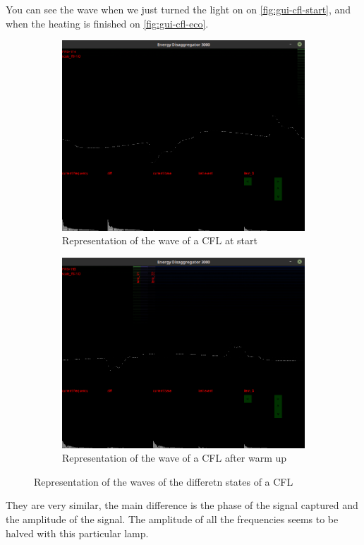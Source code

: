 You can see the wave when we just turned the light on on \autoref{fig:gui-cfl-start}, and when the heating is finished on \autoref{fig:gui-cfl-eco}.
\begin{figure}
\begin{subfigure}{\textwidth}
    \centering
    \includegraphics[trim={0 7cm 0 7cm},clip,width=\textwidth,decodearray={1 0 1 0 1 0}]{img/gui-cfl-start.png}
    \caption{Representation of the wave of a CFL at start}
    \label{fig:gui-cfl-start}
\end{subfigure}
\begin{subfigure}{\textwidth}
    \centering
    \includegraphics[trim={0 7cm 0 7cm},clip,width=\textwidth,decodearray={1 0 1 0 1 0}]{img/gui-cfl-eco.png}
    \caption{Representation of the wave of a CFL after warm up}
    \label{fig:gui-cfl-eco}
\end{subfigure}
\caption{Representation of the waves of the differetn states of a CFL}
\label{fig:gui-cfl}
\end{figure}
They are very similar, the main difference is the phase of the signal captured and the amplitude of the signal. The amplitude of all the frequencies seems to be halved with this particular lamp.

